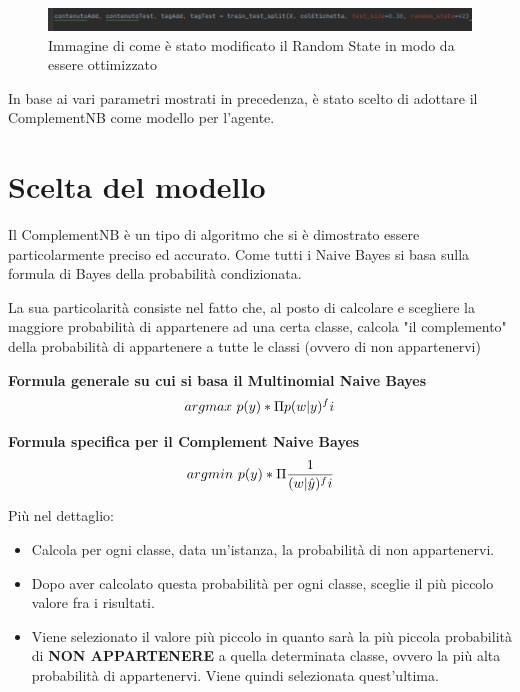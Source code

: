 \documentclass{report}
\begin{document}
    \begin{figure}[h]
            \centering
            \includegraphics[width =\textwidth]{immagini/randomState.png}
            \caption{Immagine di come è stato modificato il Random State in modo da essere ottimizzato}

    \end{figure}

    In base ai vari parametri mostrati in precedenza, è stato scelto di adottare il ComplementNB come modello per l'agente.
   
    
    \section{Scelta del modello}
    Il ComplementNB è un tipo di algoritmo che si è dimostrato essere particolarmente preciso ed accurato.
    Come tutti i Naive Bayes si basa sulla formula di Bayes della probabilità condizionata.
  
    
    La sua particolarità consiste nel fatto che, al posto di calcolare e scegliere la maggiore probabilità 
    di appartenere ad una certa classe, calcola "il complemento" della probabilità di appartenere a tutte
    le classi (ovvero di non appartenervi) 
    
    \newline
    \textbf{Formula generale su cui si basa il Multinomial Naive Bayes}
    \begin{equation}
    \centering
        argmax \ p(y)*\Pi p(w|y)^fi
        \end{equation}
        
        \textbf{Formula specifica per il Complement Naive Bayes}
        \begin{equation}
        \centering
        argmin \ p(y)*\Pi\frac{1}{(w|\hat{y})^fi}
    \end{equation}
    \newline
    
    Più nel dettaglio:
    \begin{itemize}
        \item Calcola per ogni classe, data un'istanza, la probabilità di non appartenervi.
        \item Dopo aver calcolato questa probabilità per ogni classe, sceglie il più piccolo valore fra i risultati.
        \item Viene selezionato il valore più piccolo in quanto sarà la più piccola probabilità di {\bfseries NON APPARTENERE}
        a quella determinata classe, ovvero la più alta probabilità di appartenervi. Viene quindi selezionata quest'ultima.
    \end{itemize} 
    
\end{document}
